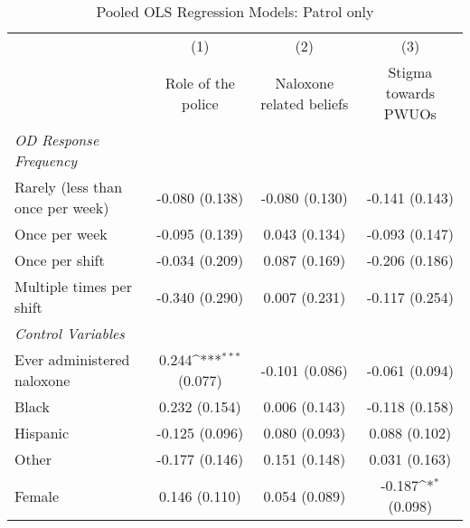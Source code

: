 \begin{table}[htbp]\centering
\def\sym#1{\ifmmode^{#1}\else\(^{#1}\)\fi}
\caption{\centering Pooled OLS Regression Models: Patrol only}
\begin{tabular}{l*{3}{c}}
\toprule
                &\multicolumn{1}{c}{(1)}&\multicolumn{1}{c}{(2)}&\multicolumn{1}{c}{(3)}\\
                &\multicolumn{1}{c}{\hspace{0.25cm} Role of the police}&\multicolumn{1}{c}{\hspace{0.25cm} Naloxone related beliefs}&\multicolumn{1}{c}{\hspace{0.25cm} Stigma towards PWUOs}\\
\midrule
\emph{OD Response Frequency}&                  &                  &                  \\
\hspace{0.25cm} Rarely (less than once per week)&-0.080 (0.138)         &-0.080 (0.130)         &-0.141 (0.143)         \\
\hspace{0.25cm} Once per week&-0.095 (0.139)         &0.043 (0.134)         &-0.093 (0.147)         \\
\hspace{0.25cm} Once per shift&-0.034 (0.209)         &0.087 (0.169)         &-0.206 (0.186)         \\
\hspace{0.25cm} Multiple times per shift&-0.340 (0.290)         &0.007 (0.231)         &-0.117 (0.254)         \\
\vspace{0.1em} \emph{Control Variables}&                  &                  &                  \\
\hspace{0.25cm} Ever administered naloxone&0.244\sym{***} (0.077)         &-0.101 (0.086)         &-0.061 (0.094)         \\
\hspace{0.25cm} Black&0.232 (0.154)         &0.006 (0.143)         &-0.118 (0.158)         \\
\hspace{0.25cm} Hispanic&-0.125 (0.096)         &0.080 (0.093)         &0.088 (0.102)         \\
\hspace{0.25cm} Other&-0.177 (0.146)         &0.151 (0.148)         &0.031 (0.163)         \\
\hspace{0.25cm} Female&0.146 (0.110)         &0.054 (0.089)         &-0.187\sym{*} (0.098)         \\

\end{tabular}
\end{table}
